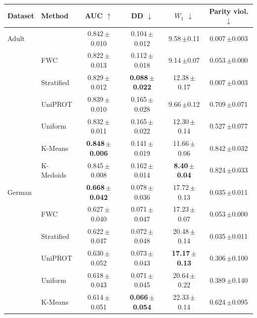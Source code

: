 \begin{tabular}{llcccc}
\toprule
Dataset & Method & AUC $\uparrow$ & DD $\downarrow$ & $W_1$ $\downarrow$ & Parity viol. $\downarrow$\\
\midrule
Adult & \method{} & 0.842\,{\scriptsize$\pm$0.010} & 0.104\,{\scriptsize$\pm$0.012} & 9.58\,{\scriptsize$\pm$0.11} & 0.007\,{\scriptsize$\pm$0.003}\\
 & FWC & 0.822\,{\scriptsize$\pm$0.013} & 0.112\,{\scriptsize$\pm$0.018} & 9.14\,{\scriptsize$\pm$0.07} & 0.053\,{\scriptsize$\pm$0.000}\\
 & Stratified & 0.829\,{\scriptsize$\pm$0.012} & \textbf{0.088\,{\scriptsize$\pm$0.022}} & 12.38\,{\scriptsize$\pm$0.17} & 0.007\,{\scriptsize$\pm$0.003}\\
 & UniPROT & 0.839\,{\scriptsize$\pm$0.010} & 0.165\,{\scriptsize$\pm$0.028} & 9.66\,{\scriptsize$\pm$0.12} & 0.709\,{\scriptsize$\pm$0.071}\\
 & Uniform & 0.832\,{\scriptsize$\pm$0.011} & 0.165\,{\scriptsize$\pm$0.022} & 12.30\,{\scriptsize$\pm$0.14} & 0.527\,{\scriptsize$\pm$0.077}\\
 & K-Means & \textbf{0.848\,{\scriptsize$\pm$0.006}} & 0.141\,{\scriptsize$\pm$0.019} & 11.66\,{\scriptsize$\pm$0.06} & 0.842\,{\scriptsize$\pm$0.032}\\
 & K-Medoids & 0.845\,{\scriptsize$\pm$0.008} & 0.162\,{\scriptsize$\pm$0.014} & \textbf{8.40\,{\scriptsize$\pm$0.04}} & 0.824\,{\scriptsize$\pm$0.033}\\
\midrule
German & \method{} & \textbf{0.668\,{\scriptsize$\pm$0.042}} & 0.078\,{\scriptsize$\pm$0.036} & 17.72\,{\scriptsize$\pm$0.13} & 0.035\,{\scriptsize$\pm$0.011}\\
 & FWC & 0.627\,{\scriptsize$\pm$0.040} & 0.071\,{\scriptsize$\pm$0.047} & 17.23\,{\scriptsize$\pm$0.07} & 0.053\,{\scriptsize$\pm$0.000}\\
 & Stratified & 0.622\,{\scriptsize$\pm$0.047} & 0.072\,{\scriptsize$\pm$0.048} & 20.48\,{\scriptsize$\pm$0.14} & 0.035\,{\scriptsize$\pm$0.011}\\
 & UniPROT & 0.630\,{\scriptsize$\pm$0.052} & 0.073\,{\scriptsize$\pm$0.043} & \textbf{17.17\,{\scriptsize$\pm$0.13}} & 0.306\,{\scriptsize$\pm$0.100}\\
 & Uniform & 0.618\,{\scriptsize$\pm$0.043} & 0.071\,{\scriptsize$\pm$0.045} & 20.64\,{\scriptsize$\pm$0.22} & 0.389\,{\scriptsize$\pm$0.140}\\
 & K-Means & 0.614\,{\scriptsize$\pm$0.051} & \textbf{0.066\,{\scriptsize$\pm$0.054}} & 22.33\,{\scriptsize$\pm$0.14} & 0.624\,{\scriptsize$\pm$0.095}\\

\end{tabular}
